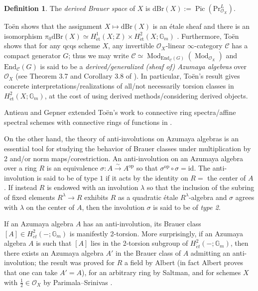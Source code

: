 \documentclass{article}
\DeclareMathOperator{\Mod}{Mod} %
\DeclareMathOperator{\Pic}{Pic} %
\newcommand{\ZZ}{\mathbb{Z}}
\newcommand{\op}{\mathrm{op}} %
\theoremstyle{definition}
\newtheorem{definition}[equation]{Definition}
\newcommand{\Lucy}[1]{\todo[color=cyan!30]{\linespread{1}\footnotesize L: #1}}
\begin{document}
\begin{definition}
    The \emph{derived Brauer space} of $ X $ is $ \mathrm{dBr}(X) := \Pic\left(\mathrm{Pr}^L_{\mathcal{O}_X} \right) $. 
\end{definition}
Toën shows that the assignment $ X \mapsto \mathrm{dBr}(X) $ is an étale sheaf and there is an isomorphism $ \pi_0 \mathrm{dBr}(X) \simeq H^1_{\mathrm{\acute{e}t}}(X; \ZZ) \times H^2_{\mathrm{\acute{e}t}}(X; \mathbb{G}_m) $ \cite[Corollary 2.12]{MR2957304}. 
Furthermore, Toën shows that for any qcqs scheme $ X $, any invertible $ \mathcal{O}_X $-linear $ \infty $-category $ \mathcal{C} $ has a compact generator $ G $; thus we may write $ \mathcal{C} \simeq \Mod_{\mathrm{End}_{\mathcal{C}}(G)} \left(\Mod_{\mathcal{O}_X}\right) $ and $ \mathrm{End}_{\mathcal{C}}(G) $ is said to be a \emph{derived/generalized (sheaf of) Azumaya algebras} over $ \mathcal{O}_X $ (see Theorem 3.7 and Corollary 3.8 of \cite{MR2957304}). 
In particular, Toën's result gives concrete interpretations/realizations of all/not necessarily torsion classes in $ H^2_{\mathrm{\acute{e}t}}(X;\mathbb{G}_m) $, at the cost of using derived methods/considering derived objects. 

Antieau and Gepner extended Toën's work to connective ring spectra/affine spectral schemes with connective rings of functions in \cite{MR3190610}. \Lucy{cite \href{https://arxiv.org/abs/2210.15743}{this} too?} 

On the other hand, the theory of anti-involutions on Azumaya algebras is an essential tool for studying the behavior of Brauer classes under multiplication by 2 and/or norm maps/corestriction. 
An anti-involution on an Azumaya algebra over a ring $ R $ is an equivalence $ \sigma \colon A \xrightarrow{\sim} A^\op $ so that $ \sigma^\op \circ \sigma = \mathrm{id} $. 
The anti-involution is said to be of type $ 1 $ if it acts by the identity on $ R = $ the center of $ A $. 
If instead $ R $ is endowed with an involution $ \lambda $ so that the inclusion of the subring of fixed elements $ R^\lambda \to R $ exhibits $ R $ as a quadratic étale $ R^\lambda $-algebra and $ \sigma $ agrees with $ \lambda $ on the center of $ A $, then the involution $ \sigma $ is said to be of \emph{type 2}. 

If an Azumaya algebra $ A $ has an anti-involution, its Brauer class $ [A] \in H^2_{\acute{e}t}(-;\mathbb{G}_m) $ is manifestly 2-torsion. 
More surprisingly, if an Azumaya algebra $ A $ is such that $ [A] $ lies in the 2-torsion subgroup of $ H^2_{\acute{e}t}(-;\mathbb{G}_m) $, then there exists an Azumaya algebra $ A' $ in the Brauer class of $ A $ admitting an anti-involution; the result was proved for $ R $ a field by Albert (in fact Albert proves that one can take $ A' = A $), for an arbitrary ring by Saltman, and for schemes $ X $ with $ \frac{1}{2} \in \mathcal{O}_X $ by Parimala--Srinivas \cites[\S9 Theorem 19]{MR123587}[Theorem 3.1(a)]{MR495234}[Theorem 1]{MR1162189}. 
\end{document}
